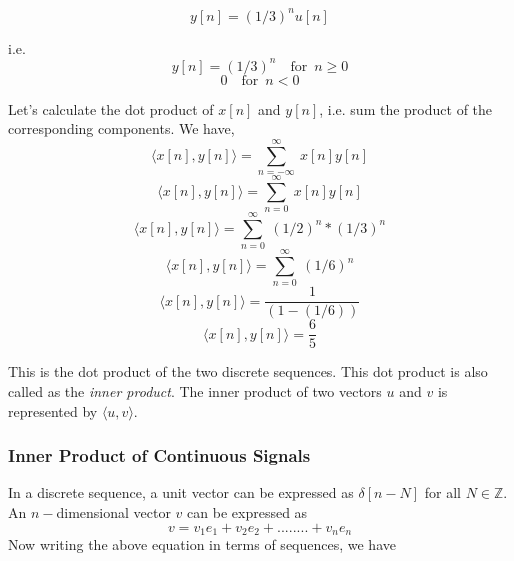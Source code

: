 	 \begin{equation*} y[n] = (1/3)^nu[n] \end{equation*}
    
    i.e. 
    \begin{equation*}y[n] = (1/3)^n	\enspace \enspace	\text{for} \enspace n\geq0\end{equation*} \begin{equation*}0\enspace \enspace			\text{for} \enspace n<0 \end{equation*}
                  
                  
  Let's calculate the dot product of $x[n]$ and $y[n]$, i.e. sum the product of the corresponding components.
  We have,
   \begin{equation*} \langle x[n],y[n] \rangle = \sum_{n=-\infty}^{\infty}\ x[n]y[n]\end{equation*} 
   \begin{equation*} \langle x[n],y[n] \rangle = \sum_{n=0}^{\infty}\ x[n]y[n]\end{equation*} 
   \begin{equation*} \langle x[n],y[n] \rangle = \sum_{n=0}^{\infty}\ (1/2)^n*(1/3)^n\end{equation*} 
   \begin{equation*} \langle x[n],y[n] \rangle = \sum_{n=0}^{\infty}\ (1/6)^n\end{equation*} 
   \begin{equation*} \langle x[n],y[n] \rangle = \frac{1}{(1-(1/6))}\end{equation*} 
   \begin{equation*} \langle x[n],y[n] \rangle = \frac{6}{5}\end{equation*} 
  		
          
 	This is the dot product of the two discrete sequences. This dot product is also called as the \emph{inner product}. The inner product of two vectors $u$ and $v$ is represented by $\langle u,v \rangle$.

\subsubsection{Inner Product of Continuous Signals}
       In a discrete sequence, a unit vector can be expressed as $\delta[n-N]$ for all $N \in \mathbb{Z}$. An $n-$dimensional vector $v$ can be expressed as
        \begin{equation*}v = v_1e_1 + v_2e_2 + ........ + v_ne_n\end{equation*}
        Now writing the above equation in terms of sequences, we have
       
